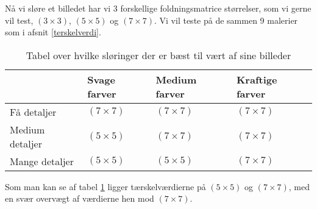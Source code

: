 Nå vi sløre et billedet har vi 3 forskellige foldningsmatrice størrelser, som vi
gerne vil test, $(3 \times 3)$, $(5 \times 5)$ og $(7 \times 7)$. Vi vil teste
på de sammen 9 malerier som i afsnit \ref{terskelverdi}.

\begin{table}[!h]
    \centering
    \begin{tabular}{| l | l | l | l |} \hline
                            & Svage farver	& Medium farver	& Kraftige farver 	\\ \hline
        Få detaljer 		& $(7 \times 7)$	& $(7 \times 7)$	& $(7 \times 7)$		\\ \hline
        Medium detaljer 	& $(5 \times 5)$	& $(7 \times 7)$	& $(7 \times 7)$		\\ \hline
        Mange detaljer		& $(5 \times 5)$	& $(5 \times 5)$	& $(7 \times 7)$		\\ \hline
    \end{tabular}
    \caption{Tabel over hvilke sløringer der er bæst til vært af sine billeder}
    \label{sloringTabel}
\end{table}

Som man kan se af tabel \ref{sloringTabel} ligger tærskelværdierne på
$(5 \times 5)$ og $(7 \times 7)$, med en svær overvægt af værdierne hen
mod $(7 \times 7)$.
